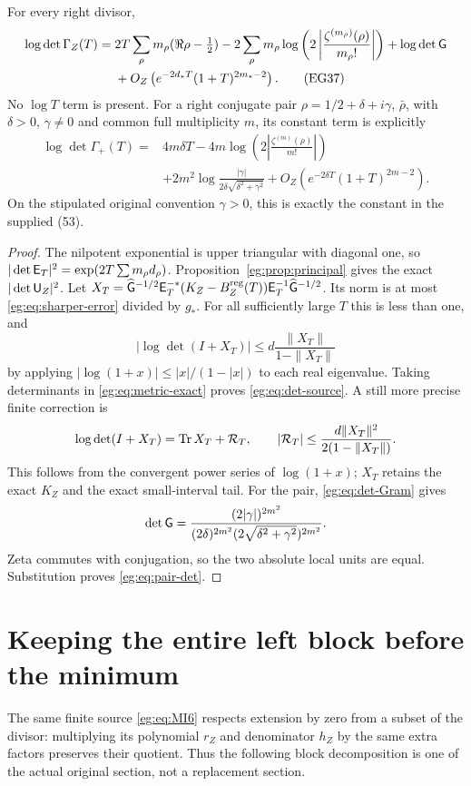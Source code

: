 \begin{egtheorem}\label{eg:thm:det-source}
For every right divisor,
\begin{align}
 \log\det\Gamma_Z(T)
 ={}&2T\sum_\rho m_\rho(\Re\rho-\tfrac12)
 -2\sum_\rho m_\rho\log\left(2\left|
                 \frac{\zeta^{(m_\rho)}(\rho)}{m_\rho!}\right|\right)
 +\log\det\mathsf G\notag\\
 &+O_Z\left(e^{-2d_*T}(1+T)^{2m_*-2}\right).
 \tag{EG37}\label{eg:eq:det-source}
\end{align}
No $\log T$ term is present. For a right conjugate pair
$\rho=1/2+\delta+i\gamma$, $\bar\rho$, with $\delta>0$, $\gamma\ne0$
and common full multiplicity $m$, its constant term is explicitly
\[
 \begin{split}
 \log\det\Gamma_+(T)={}&4m\delta T
 -4m\log\left(2\left|\frac{\zeta^{(m)}(\rho)}{m!}\right|\right)\\
 &+2m^2\log\frac{|\gamma|}{2\delta\sqrt{\delta^2+\gamma^2}}
                  +O_Z(e^{-2\delta T}(1+T)^{2m-2}).
 \end{split}\tag{EG38}\label{eg:eq:pair-det}
\]
On the stipulated original convention $\gamma>0$, this is exactly
the constant in the supplied (53).
\end{egtheorem}
\begin{proof}
The nilpotent exponential is upper triangular with diagonal one, so
$|\det\mathsf E_T|^2=\exp(2T\sum m_\rho d_\rho)$.
Proposition~\ref{eg:prop:principal} gives the exact $|\det\mathsf U_Z|^2$.
Let
$X_T=\widehat{\mathsf G}^{-1/2}\mathsf E_T^{-*}
(K_Z-B_Z^{\rm reg}(T))\mathsf E_T^{-1}\widehat{\mathsf G}^{-1/2}$.
Its norm is at most \eqref{eg:eq:sharper-error} divided by $g_*$.
For all sufficiently large $T$ this is less than one, and
\[
 |\log\det(I+X_T)|\le d\frac{\|X_T\|}{1-\|X_T\|}
\]
by applying $|\log(1+x)|\le |x|/(1-|x|)$ to each real eigenvalue.
Taking determinants in \eqref{eg:eq:metric-exact} proves
\eqref{eg:eq:det-source}. A still more precise finite correction is
\[
 \log\det(I+X_T)=\operatorname{Tr} X_T+\mathcal R_T,\qquad
 |\mathcal R_T|\le\frac{d\|X_T\|^2}{2(1-\|X_T\|)}.
\]
This follows from the convergent power series of $\log(1+x)$;
$X_T$ retains the exact $K_Z$ and the exact small-interval tail.
For the pair, \eqref{eg:eq:det-Gram} gives
\[
 \det\mathsf G=\frac{(2|\gamma|)^{2m^2}}
                 {(2\delta)^{2m^2}(2\sqrt{\delta^2+\gamma^2})^{2m^2}}.
\]
Zeta commutes with conjugation, so the two absolute local units are
equal. Substitution proves \eqref{eg:eq:pair-det}.
\end{proof}

\section{Keeping the entire left block before the minimum}\label{eg:sec:left-quotient}
The same finite source \eqref{eg:eq:MI6} respects extension by zero
from a subset of the divisor: multiplying its polynomial $r_Z$ and
denominator $h_Z$ by the same extra factors preserves their quotient.
Thus the following block decomposition is one of the actual original
section, not a replacement section.

